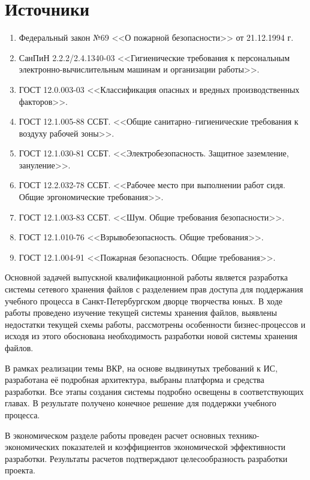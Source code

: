 \documentclass[utf8,usehyperref,12pt]{G7-32}
\begin{document}
\section{Источники}
\begin{enumerate}
\item Федеральный закон №69 <<О пожарной безопасности>> от 21.12.1994 г.
\item СанПиН 2.2.2/2.4.1340-03 <<Гигиенические требования к персональным электронно-вычислительным машинам и организации работы>>.
\item ГОСТ 12.0.003-03 <<Классификация опасных и вредных производственных факторов>>.
\item ГОСТ 12.1.005-88 ССБТ. <<Общие санитарно–гигиенические требования к воздуху рабочей зоны>>.
\item ГОСТ 12.1.030-81 ССБТ. <<Электробезопасность. Защитное заземление, зануление>>.
\item ГОСТ 12.2.032-78 ССБТ. <<Рабочее место при выполнении работ сидя. Общие эргономические требования>>.
\item ГОСТ 12.1.003-83 ССБТ. <<Шум. Общие требования безопасности>>.
\item ГОСТ 12.1.010-76 <<Взрывобезопасность. Общие требования>>.
\item ГОСТ 12.1.004-91 <<Пожарная безопасность. Общие требования>>.
\end{enumerate}

\Conclusion

Основной задачей выпускной квалификационной работы является разработка системы сетевого хранения файлов с разделением прав доступа для поддержания учебного процесса в Санкт-Петербургском дворце творчества юных. В ходе работы проведено изучение текущей системы хранения файлов, выявлены недостатки текущей схемы работы, рассмотрены особенности бизнес-процессов и исходя из этого обоснована необходимость разработки новой системы хранения файлов. 

В рамках реализации темы ВКР, на основе выдвинутых требований к ИС, разработана её подробная архитектура, выбраны платформа и средства разработки. Все этапы создания системы подробно освещены в соответствующих главах. В результате получено конечное решение для поддержки учебного процесса.

В экономическом разделе работы проведен расчет основных технико-экономических показателей и коэффициентов экономической эффективности разработки. Результаты расчетов подтверждают целесообразность разработки проекта.
\end{document}
